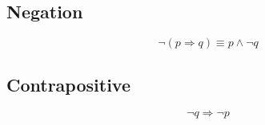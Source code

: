 \documentclass[11pt]{article}
\begin{document}
	\subsection{Negation}
		\begin{equation}
			\lnot(p\Rightarrow q)\equiv p\wedge\lnot q
		\end{equation}
		
	\subsection{Contrapositive}
		\begin{equation}
			\lnot q\Rightarrow\lnot p
		\end{equation}
	
%		
%		


\end{document}
